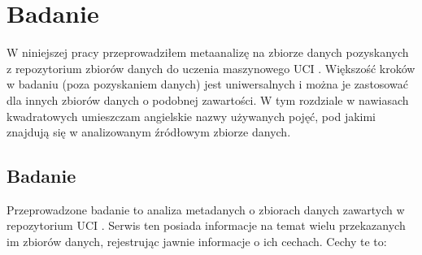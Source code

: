 \chapter{Badanie}

W niniejszej pracy przeprowadziłem metaanalizę na zbiorze danych pozyskanych z repozytorium zbiorów danych do uczenia maszynowego UCI \cite{Dua:2021}.
Większość kroków w badaniu (poza pozyskaniem danych) jest uniwersalnych i można je zastosować dla innych zbiorów danych o podobnej zawartości.
W tym rozdziale w nawiasach kwadratowych umieszczam angielskie nazwy używanych pojęć, pod jakimi znajdują się w analizowanym źródłowym zbiorze danych.

\section{Badanie}

Przeprowadzone badanie to analiza metadanych o zbiorach danych zawartych w repozytorium UCI \cite{Dua:2021}.
Serwis ten posiada informacje na temat wielu przekazanych im zbiorów danych, rejestrując jawnie informacje o ich cechach.
Cechy te to:

